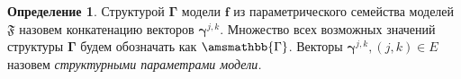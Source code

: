\documentclass[11pt, a5paper]{dissert}
\theoremstyle{definition}
\newtheorem{defin}{Определение}
\newcommand{\T}{\mathsf{T}}
\begin{document}
\begin{defin}
Структурой $\boldsymbol{\Gamma}$  модели $\mathbf{f}$ из параметрического семейства моделей $\mathfrak{F}$  назовем конкатенацию векторов $\boldsymbol{\gamma}^{j,k}$. Множество всех возможных значений структуры $\boldsymbol{\Gamma}$ будем обозначать как $\amsmathbb{\Gamma}$.
Векторы $\boldsymbol{\gamma}^{j,k}, (j,k) \in E$ назовем \textit{структурными параметрами модели.}
\end{defin}


\end{document}
